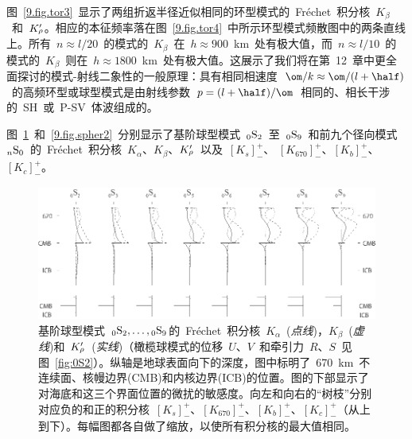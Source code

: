 图~\ref{9.fig.tor3}~显示了两组折返半径近似相同的环型模式的~Fr\'{e}chet~积分核~$K_{\beta}$~和~$K_{\raisebox{0.3 ex}{\scriptsize$\rho$}}^{\prime}$。相应的本征频率落在图~\ref{9.fig.tor4}~中所示环型模式频散图中的两条直线上。所有~$n\approx l/20$~的模式的~$K_{\beta}$~在~$h\approx 900$~km~处有极大值，而~$n\approx l/10$~的模式的~$K_{\beta}$~则在~$h\approx 1800$~km~处有极大值。这展示了我们将在第~12~章中更全面探讨的模式-射线二象性的一般原理：具有相同相速度~$\om/k\approx\om/(l+\half)$~的高频环型或球型模式是由射线参数~$p=(l+\half)/\om$~相同的、相长干涉的~SH~或~P-SV~体波组成的。

图~\ref{9.fig.spher1}~和~\ref{9.fig.spher2}~分别显示了基阶球型模式~${}_0{\rm S}_2$~至~${}_0{\rm S}_9$~和前九个径向模式~${}_n{\rm S}_0$~的~Fr\'{e}chet~积分核~$K_{\alpha}$、$K_{\beta}$、$K_{\raisebox{0.3 ex}{\scriptsize$\rho$}}^{\prime}$~以及~$[K_s]^+_-$、
$[K_{670}]^+_-$、$[K_b]^+_-$、$[K_c]^+_-$。
\begin{figure}
\begin{center}
\includegraphics{../figures/chap09/fig05.eps}
\end{center}
\caption[spherkernels]{\label{9.fig.spher1}
基阶球型模式~${}_0{\rm S}_2, \ldots,{}_0{\rm S}_9$的~Fr\'{e}chet~积分核~$K_{\alpha}$~({\em 点线\/})，$K_{\beta}$~({\em 虚线\/})和~$K_{\raisebox{0.3 ex}{\scriptsize$\rho$}}^{\prime}$~({\em 实线\/})（橄榄球模式的位移~$U$、$V$~和牵引力~$R$、$S$~见图~\ref{fig:0S2}）。纵轴是地球表面向下的深度，图中标明了~670~km~不连续面、核幔边界(CMB)和内核边界(ICB)的位置。图的下部显示了对海底和这三个界面位置的微扰的敏感度。向左和向右的“树枝”分别对应负的和正的积分核~$[K_s]^+_-$、$[K_{670}]^+_-$、$[K_b]^+_-$、$[K_c]^+_-$（从上到下）。每幅图都各自做了缩放，以使所有积分核的最大值相同。
}
\end{figure}
